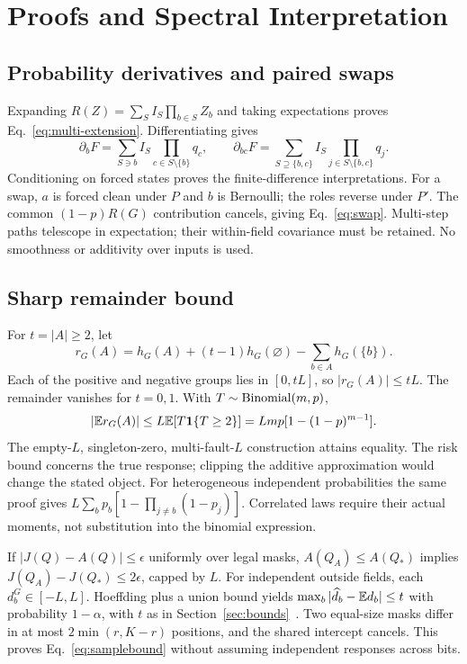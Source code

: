\appendix
\section{Proofs and Spectral Interpretation}\label{app:math}
\subsection{Probability derivatives and paired swaps}
Expanding $R(Z)=\sum_S I_S\prod_{b\in S}Z_b$ and taking expectations proves Eq.~\eqref{eq:multi-extension}. Differentiating gives
\[
\partial_bF=\sum_{S\ni b}I_S\prod_{c\in S\setminus\{b\}}q_c,\qquad
\partial_{bc}F=\sum_{S\supseteq\{b,c\}}I_S\prod_{j\in S\setminus\{b,c\}}q_j.
\]
Conditioning on forced states proves the finite-difference interpretations. For a swap, $a$ is forced clean under $P$ and $b$ is Bernoulli; the roles reverse under $P'$. The common $(1-p)R(G)$ contribution cancels, giving Eq.~\eqref{eq:swap}. Multi-step paths telescope in expectation; their within-field covariance must be retained. No smoothness or additivity over inputs is used.

\subsection{Sharp remainder bound}
For $t=|A|\ge2$, let
\[
r_G(A)=h_G(A)+(t-1)h_G(\varnothing)-\sum_{b\in A}h_G(\{b\}).
\]
Each of the positive and negative groups lies in $[0,tL]$, so $|r_G(A)|\le tL$. The remainder vanishes for $t=0,1$. With $T\sim{\rm Binomial}(m,p)$,
\[
|\mathbb{E} r_G(A)|\le L\mathbb{E}[T\mathbf1\{T\ge2\}]
=Lmp[1-(1-p)^{m-1}].
\]
The empty-$L$, singleton-zero, multi-fault-$L$ construction attains equality. The risk bound concerns the true response; clipping the additive approximation would change the stated object. For heterogeneous independent probabilities the same proof gives $L\sum_b p_b[1-\prod_{j\ne b}(1-p_j)]$. Correlated laws require their actual moments, not substitution into the binomial expression.

If $|J(Q)-A(Q)|\le\epsilon$ uniformly over legal masks, $A(Q_A)\le A(Q_*)$ implies $J(Q_A)-J(Q_*)\le2\epsilon$, capped by $L$. For independent outside fields, each $d_b^G\in[-L,L]$. Hoeffding plus a union bound yields $\max_b|\widehat d_b-\mathbb{E} d_b|\le t$ with probability $1-\alpha$, with $t$ as in Section~\ref{sec:bounds}~\cite{hoeffding1963}. Two equal-size masks differ in at most $2\min(r,K-r)$ positions, and the shared intercept cancels. This proves Eq.~\eqref{eq:samplebound} without assuming independent responses across bits.

